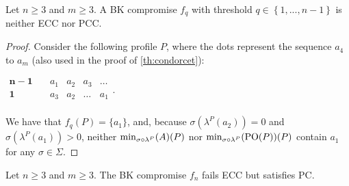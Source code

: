 \documentclass[version=3.21, pagesize, twoside=off, bibliography=totoc, DIV=calc, fontsize=12pt, a4paper]{scrartcl}
\begin{document}
\begin{theorem}
	\label{th:BKthreshold}
Let $n\geq 3$ and $m\geq 3.$ A BK compromise $f_{q}$ with threshold $q \in
\left\{ 1,...,n-1\right\} $ is neither ECC nor PCC.
\end{theorem}
\begin{proof}
Consider the following profile $P$, where the dots represent the sequence $a_4$ to $a_m$ (also used in the proof of \cref{th:condorcet}):
	\begin{center}
		$
		\begin{array}{cccccc}
		\mathbf{n-1} \quad &a_1&a_2&a_3&\dots\\
		\mathbf{1} \quad &a_3&a_2&\dots&a_1\\
		\end{array}
		$.
	\end{center}
We have that $f_{q}(P)=\{a_1\}$, and, because $\sigma(\lambda^P(a_2)) = 0$ and $\sigma(\lambda^P(a_1)) > 0$, neither $\musigma(P)$ nor $\mustar(P)$ contain $a_1$ for any $\sigma \in \Sigma$. 
\end{proof}

\begin{theorem}
	\label{th:FBn3}
Let $n\geq 3$ and $m\geq 3.$ The BK compromise $f_{n}$ fails ECC but satisfies PC.
\end{theorem}
\end{document}
